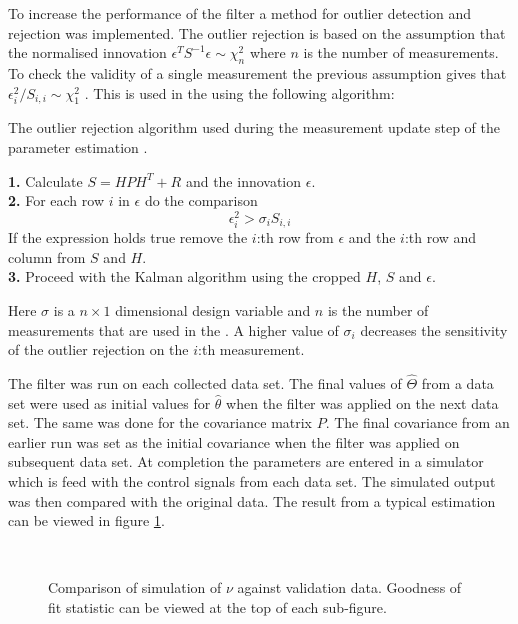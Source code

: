 To increase the performance of the filter a method for outlier detection and rejection was implemented.
The outlier rejection is based on the assumption that the normalised innovation $\epsilon^T S^{-1} \epsilon \sim \chi_{n}^{2}$ where $n$ is the number of measurements. To check the validity of a single measurement the previous assumption gives that $\epsilon_i^{2}/ S_{i,i} \sim \chi_{1}^{2}$ \citep{sensorfusion}. This is used in the \abbrEKF using the following algorithm:
\begin{algorithm}[H]
\label{alg:outlier}
\caption{The outlier rejection algorithm used during the measurement update step of the parameter estimation \abbrEKF.}
\textbf{1.} Calculate $S=H P H^T + R$ and the innovation $\epsilon$.
\\
\textbf{2.} For each row $i$ in $\epsilon$ do the comparison
\begin{equation}
\epsilon_{i}^{2} > \sigma_i S_{i,i}
\end{equation}
If the expression holds true remove the $i$:th row from $\epsilon$ and the $i$:th row and column from $S$ and $H$.\\
\textbf{3.} Proceed with the Kalman algorithm using the cropped $H$, $S$ and $\epsilon$.
\end{algorithm}
Here $\sigma$ is a $n\times1$ dimensional design variable and $n$ is the number of measurements that are used in the \abbrEKF. A higher value of $\sigma_i$ decreases the sensitivity of the outlier rejection on the $i$:th measurement.

The filter was run on each collected data set. The final values of $\hat{\Theta}$ from a data set were used as initial values for $\hat{\theta}$ when the filter was applied on the next data set. The same was done for the covariance matrix $P$. The final covariance from an earlier run was set as the initial covariance when the filter was applied on subsequent data set.
At completion the parameters are entered in a simulator which is feed with the control signals from each data set. The simulated  output was then compared with the original data. The result from a typical estimation can be viewed in figure \ref{fig:KalmanCompare}.
\begin{figure}[tbp]
  \centering
  \qquad
  \\
  \caption{\label{fig:KalmanCompare}%
    Comparison of simulation of $\nu$ against validation data. Goodness of fit statistic can be viewed at the top of each sub-figure.}
\end{figure}


